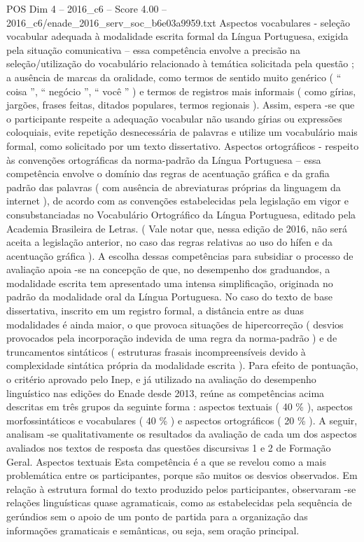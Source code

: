 \begin{textsample}{POS Dim 4 – 2016\_c6 – Score 4.00 – 2016\_c6/enade\_2016\_serv\_soc\_b6e03a9959.txt}
Aspectos vocabulares - seleção vocabular adequada à modalidade escrita formal da Língua Portuguesa, exigida pela situação comunicativa – essa competência envolve a precisão na seleção/utilização do vocabulário relacionado à temática solicitada pela questão ; a ausência de marcas da oralidade, como termos de sentido muito genérico ( “ coisa ”, “ negócio ”, “ você ” ) e termos de registros mais informais ( como gírias, jargões, frases feitas, ditados populares, termos regionais ).
Assim, espera -se que o participante respeite a adequação vocabular não usando gírias ou expressões coloquiais, evite repetição desnecessária de palavras e utilize um vocabulário mais formal, como solicitado por um texto dissertativo.
Aspectos ortográficos - respeito às convenções ortográficas da norma-padrão da Língua Portuguesa – essa competência envolve o domínio das regras de acentuação gráfica e da grafia padrão das palavras ( com ausência de abreviaturas próprias da linguagem da internet ), de acordo com as convenções estabelecidas pela legislação em vigor e consubstanciadas no Vocabulário Ortográfico da Língua Portuguesa, editado pela Academia Brasileira de Letras. ( Vale notar que, nessa edição de 2016, não será aceita a legislação anterior, no caso das regras relativas ao uso do hífen e da acentuação gráfica ).
A escolha dessas competências para subsidiar o processo de avaliação apoia -se na concepção de que, no desempenho dos graduandos, a modalidade escrita tem apresentado uma intensa simplificação, originada no padrão da modalidade oral da Língua Portuguesa.
No caso do texto de base dissertativa, inscrito em um registro formal, a distância entre as duas modalidades é ainda maior, o que provoca situações de hipercorreção ( desvios provocados pela incorporação indevida de uma regra da norma-padrão ) e de truncamentos sintáticos ( estruturas frasais incompreensíveis devido à complexidade sintática própria da modalidade escrita ).
Para efeito de pontuação, o critério aprovado pelo Inep, e já utilizado na avaliação do desempenho linguístico nas edições do Enade desde 2013, reúne as competências acima descritas em três grupos da seguinte forma : aspectos textuais ( 40 \% ), aspectos morfossintáticos e vocabulares ( 40 \% ) e aspectos ortográficos ( 20 \% ).
A seguir, analisam -se qualitativamente os resultados da avaliação de cada um dos aspectos avaliados nos textos de resposta das questões discursivas 1 e 2 de Formação Geral.
Aspectos textuais Esta competência é a que se revelou como a mais problemática entre os participantes, porque são muitos os desvios observados.
Em relação à estrutura formal do texto produzido pelos participantes, observaram -se relações linguísticas quase agramaticais, como as estabelecidas pela sequência de gerúndios sem o apoio de um ponto de partida para a organização das informações gramaticais e semânticas, ou seja, sem oração principal.

\end{textsample}
